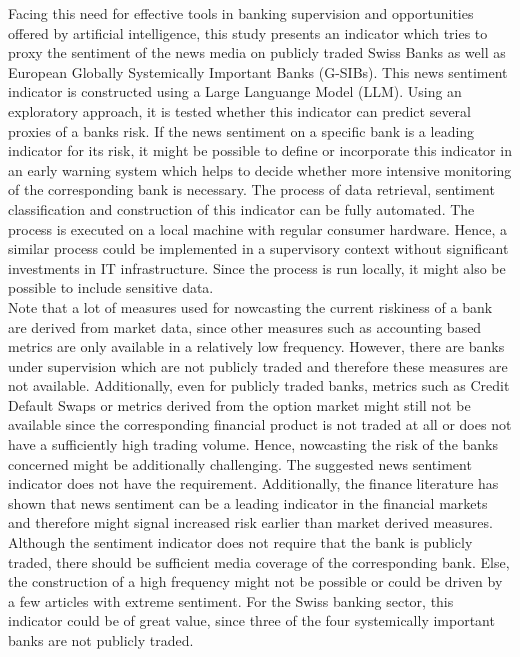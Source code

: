 Facing this need for effective tools in banking supervision and opportunities offered by artificial intelligence, this study presents an indicator which tries to proxy the sentiment of the news media on publicly traded Swiss Banks as well as European Globally Systemically Important Banks (G-SIBs). This news sentiment indicator is constructed using a Large Languange Model (LLM). Using an exploratory approach, it is tested whether this indicator can predict several proxies of a banks risk. If the news sentiment on a specific bank is a leading indicator for its risk, it might be possible to define or incorporate this indicator in an early warning system which helps to decide whether more intensive monitoring of the corresponding bank is necessary. The process of data retrieval, sentiment classification and construction of this indicator can be fully automated. The process is executed on a local machine with regular consumer hardware. Hence, a similar process could be implemented in a supervisory context without significant investments in IT infrastructure. Since the process is run locally, it might also be possible to include sensitive data. \\

Note that a lot of measures used for nowcasting the current riskiness of a bank are derived from market data, since other measures such as accounting based metrics are only available in a relatively low frequency. However, there are banks under supervision which are not publicly traded and therefore these measures are not available. Additionally, even for publicly traded banks, metrics such as Credit Default Swaps or metrics derived from the option market might still not be available since the corresponding financial product is not traded at all or does not have a sufficiently high trading volume. Hence, nowcasting the risk of the banks concerned might be additionally challenging. The suggested news sentiment indicator does not have the requirement. Additionally, the finance literature has shown that news sentiment can be a leading indicator in the financial markets and therefore might signal increased risk earlier than market derived measures. Although the sentiment indicator does not require that the bank is publicly traded, there should be sufficient media coverage of the corresponding bank. Else, the construction of a high frequency might not be possible or could be driven by a few articles with extreme sentiment. For the Swiss banking sector, this indicator could be of great value, since three of the four systemically important banks are not publicly traded.



\cleardoublepage
